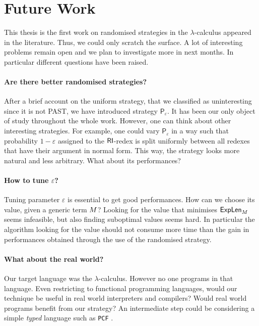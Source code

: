 \section{Future Work}
This thesis is the first work on randomised strategies in the $\lambda$-calculus appeared in the literature. Thus, we could only scratch the surface. A lot of interesting problems remain open and we plan to investigate more in next months. In particular different questions have been raised.
\paragraph{Are there better randomised strategies?} After a brief account on the uniform strategy, that we classified as uninteresting since it is not PAST, we have introduced strategy $\mathsf{P}_\varepsilon$. It has been our only object of study throughout the whole work. However, one can think about other interesting strategies. For example, one could vary $\mathsf{P}_\varepsilon$ in a way such that probability $1-\varepsilon$ assigned to the $\textsf{RI}$-redex is split uniformly between all redexes that have their argument in normal form. This way, the strategy looks more natural and less arbitrary. What about its performances?
\paragraph{How to tune $\varepsilon$?} Tuning parameter $\varepsilon$ is essential to get good performances. How can we choose its value, given a generic term $M$? Looking for the value that minimises $\textsf{ExpLen}_{M}$ seems infeasible, but also finding suboptimal values seems hard. In particular the algorithm looking for the value should not consume more time than the gain in performances obtained through the use of the randomised strategy.
\paragraph{What about the real world?} Our target language was the $\lambda$-calculus. However no one programs in that language. Even restricting to functional programming languages, would our technique be useful in real world interpreters and compilers? Would real world programs benefit from our strategy? An intermediate step could be considering a simple \emph{typed} language such as \texttt{PCF} \cite{plotkin_lcf_1977}. 